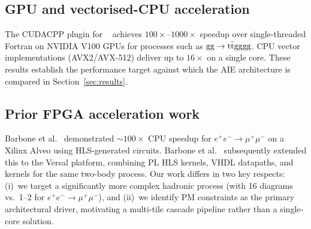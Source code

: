 \subsection{GPU and vectorised-CPU acceleration}

The CUDACPP plugin for \mgfive~\cite{Valassi:2025xfn} achieves
$100\times$--$1000\times$ speedup over single-threaded Fortran on NVIDIA V100
GPUs for processes such as $\mathrm{gg}\to\mathrm{t}\bar{\mathrm{t}}\mathrm{gg}\mathrm{gg}$.  CPU vector
implementations (AVX2/AVX-512) deliver up to $16\times$ on a single core.
These results establish the performance target against which the AIE
architecture is compared in Section~\ref{sec:results}.

\subsection{Prior FPGA acceleration work}

Barbone et al.~\cite{Carrazza:2021gpx} demonstrated ${\sim}100\times$ CPU
speedup for $e^+e^-\to\mu^+\mu^-$ on a Xilinx Alveo using HLS-generated
circuits.  Barbone et al.~\cite{Barbone:2023mul} subsequently extended this to
the Versal platform, combining PL HLS kernels, VHDL datapaths, and \aie
kernels for the same two-body process.  Our work differs in two key respects:
(i)~we target a significantly more complex hadronic process (\ggttg with 16
diagrams vs.\ 1--2 for $e^+e^-\to\mu^+\mu^-$), and (ii)~we identify PM
constraints as the primary architectural driver, motivating a multi-tile
cascade pipeline rather than a single-core solution.
